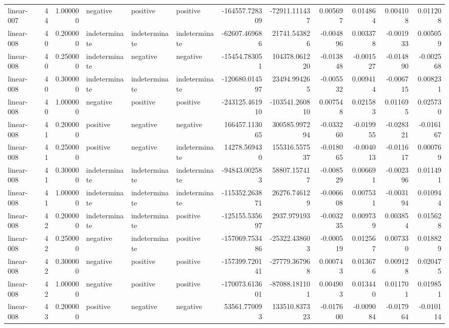 \begin{tabular}{lrrlllrrrrrr}
linear-007 & 44 & 1.000000 & negative & positive & positive & -164557.728309 & -72911.111437 & 0.005697 & 0.014864 & 0.004108 & 0.011208 \\
linear-008 & 40 & 0.200000 & indeterminate & indeterminate & indeterminate & -62607.469686 & 21741.543826 & -0.004896 & 0.003378 & -0.001933 & 0.005059 \\
linear-008 & 40 & 0.250000 & indeterminate & negative & negative & -15454.783051 & 104378.061220 & -0.013848 & -0.001527 & -0.014890 & -0.002568 \\
linear-008 & 40 & 0.300000 & indeterminate & indeterminate & indeterminate & -120680.014597 & 23494.994265 & -0.005532 & 0.009414 & -0.006715 & 0.008231 \\
linear-008 & 40 & 1.000000 & negative & positive & positive & -243125.461910 & -103541.260810 & 0.007548 & 0.021583 & 0.011695 & 0.025730 \\
linear-008 & 41 & 0.200000 & positive & negative & negative & 166457.113065 & 300585.997294 & -0.033260 & -0.019955 & -0.028321 & -0.016167 \\
linear-008 & 41 & 0.250000 & positive & negative & indeterminate & 14278.569430 & 155316.557537 & -0.018065 & -0.004013 & -0.011617 & 0.000769 \\
linear-008 & 41 & 0.300000 & indeterminate & indeterminate & indeterminate & -94843.002583 & 58807.157417 & -0.008529 & 0.006691 & -0.002396 & 0.011491 \\
linear-008 & 41 & 1.000000 & indeterminate & indeterminate & indeterminate & -115352.263871 & 26276.746129 & -0.006608 & 0.007531 & -0.003194 & 0.010944 \\
linear-008 & 42 & 0.200000 & indeterminate & indeterminate & positive & -125155.535697 & 2937.979193 & -0.003235 & 0.009739 & 0.003854 & 0.015628 \\
linear-008 & 42 & 0.250000 & negative & indeterminate & positive & -157069.753486 & -25322.438603 & -0.000519 & 0.012567 & 0.007330 & 0.018829 \\
linear-008 & 42 & 0.300000 & negative & positive & positive & -157399.720141 & -27779.367968 & 0.000743 & 0.013676 & 0.009128 & 0.020475 \\
linear-008 & 42 & 1.000000 & negative & positive & positive & -170073.613601 & -87088.181101 & 0.004903 & 0.013440 & 0.011701 & 0.019851 \\
linear-008 & 43 & 0.200000 & positive & negative & negative & 53561.770093 & 133510.837323 & -0.017600 & -0.009084 & -0.017964 & -0.010114 \\

\end{tabular}
